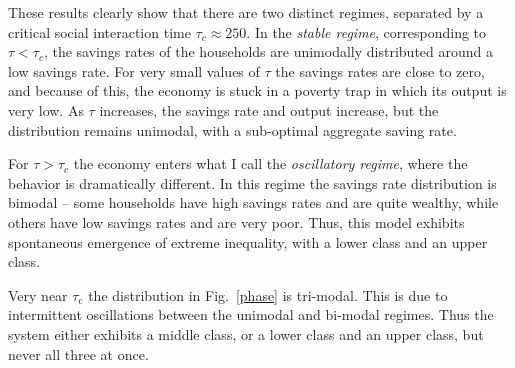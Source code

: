 These results clearly show that there are two distinct regimes, separated by a critical social interaction time $\tau_{c} \approx 250$.
In the \emph{stable regime}, corresponding to $\tau < \tau_{c}$, the savings rates of the households are unimodally distributed around a low savings rate.  For very small values of $\tau$ the savings rates are close to zero, and because of this, the economy is stuck in a poverty trap in which its output is very low.  As $\tau$ increases, the savings rate and output increase, but the distribution remains unimodal, with a sub-optimal aggregate saving rate.

For $\tau \! > \! \tau_{c}$ the economy enters what I call the \emph{ oscillatory regime}, where the behavior is dramatically different. In this regime the savings rate distribution is bimodal -- some households have high savings rates and are quite wealthy, while others have low savings rates and are very poor.  Thus, this model exhibits spontaneous emergence of extreme inequality, with a lower class and an upper class.

Very near $\tau_\mathrm{c}$ the distribution in Fig.~\ref{phase} is tri-modal. This is due to intermittent oscillations between the unimodal and bi-modal regimes. Thus the system either exhibits a middle class, or a lower class and an upper class, but never all three at once.

